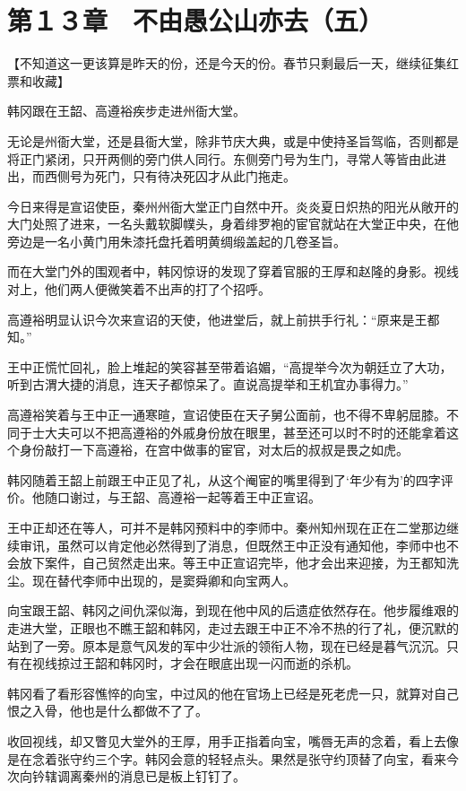 \section{第１３章　不由愚公山亦去（五）}

【不知道这一更该算是昨天的份，还是今天的份。春节只剩最后一天，继续征集红票和收藏】

韩冈跟在王韶、高遵裕疾步走进州衙大堂。

无论是州衙大堂，还是县衙大堂，除非节庆大典，或是中使持圣旨驾临，否则都是将正门紧闭，只开两侧的旁门供人同行。东侧旁门号为生门，寻常人等皆由此进出，而西侧号为死门，只有待决死囚才从此门拖走。

今日来得是宣诏使臣，秦州州衙大堂正门自然中开。炎炎夏日炽热的阳光从敞开的大门处照了进来，一名头戴软脚幞头，身着绯罗袍的宦官就站在大堂正中央，在他旁边是一名小黄门用朱漆托盘托着明黄绸缎盖起的几卷圣旨。

而在大堂门外的围观者中，韩冈惊讶的发现了穿着官服的王厚和赵隆的身影。视线对上，他们两人便微笑着不出声的打了个招呼。

高遵裕明显认识今次来宣诏的天使，他进堂后，就上前拱手行礼：“原来是王都知。”

王中正慌忙回礼，脸上堆起的笑容甚至带着谄媚，“高提举今次为朝廷立了大功，听到古渭大捷的消息，连天子都惊呆了。直说高提举和王机宜办事得力。”

高遵裕笑着与王中正一通寒暄，宣诏使臣在天子舅公面前，也不得不卑躬屈膝。不同于士大夫可以不把高遵裕的外戚身份放在眼里，甚至还可以时不时的还能拿着这个身份敲打一下高遵裕，在宫中做事的宦官，对太后的叔叔是畏之如虎。

韩冈随着王韶上前跟王中正见了礼，从这个阉宦的嘴里得到了‘年少有为’的四字评价。他随口谢过，与王韶、高遵裕一起等着王中正宣诏。

王中正却还在等人，可并不是韩冈预料中的李师中。秦州知州现在正在二堂那边继续审讯，虽然可以肯定他必然得到了消息，但既然王中正没有通知他，李师中也不会放下案件，自己贸然走出来。等王中正宣诏完毕，他才会出来迎接，为王都知洗尘。现在替代李师中出现的，是窦舜卿和向宝两人。

向宝跟王韶、韩冈之间仇深似海，到现在他中风的后遗症依然存在。他步履维艰的走进大堂，正眼也不瞧王韶和韩冈，走过去跟王中正不冷不热的行了礼，便沉默的站到了一旁。原本是意气风发的军中少壮派的领衔人物，现在已经是暮气沉沉。只有在视线掠过王韶和韩冈时，才会在眼底出现一闪而逝的杀机。

韩冈看了看形容憔悴的向宝，中过风的他在官场上已经是死老虎一只，就算对自己恨之入骨，他也是什么都做不了了。

收回视线，却又瞥见大堂外的王厚，用手正指着向宝，嘴唇无声的念着，看上去像是在念着张守约三个字。韩冈会意的轻轻点头。果然是张守约顶替了向宝，看来今次向钤辖调离秦州的消息已是板上钉钉了。

